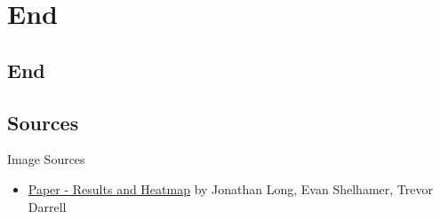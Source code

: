 \section*{End}
\subsection{End}
\subsection{Sources}
\begin{frame}{Image Sources}
    \begin{itemize}
	\item \href{http://arxiv.org/abs/1411.4038}{Paper - Results and Heatmap} by Jonathan Long, Evan Shelhamer, Trevor Darrell
    \end{itemize}
\end{frame}

